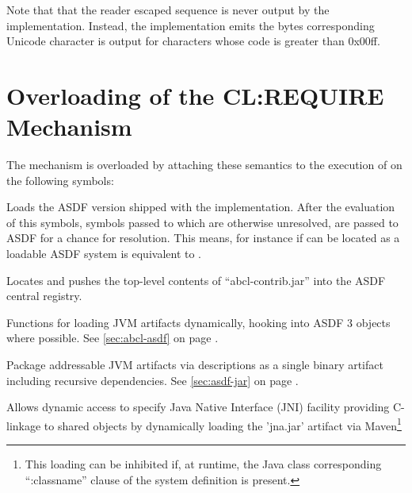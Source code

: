 \documentclass[10pt]{book}
\begin{document}
Note that that the reader escaped sequence is never output by the
implementation.  Instead, the implementation emits the bytes
corresponding Unicode character is output for characters whose code is
greater than 0x00ff.

\section{Overloading of the CL:REQUIRE Mechanism}

The  mechanism is overloaded by attaching these
semantics to the execution of  on the following symbols:

\begin{description}[style=nextline]

  \item[\code{ASDF}] Loads the \textsc{ASDF} version shipped with the
    implementation.  After the evaluation of this symbols, symbols
    passed to  which are otherwise unresolved, are
    passed to ASDF for a chance for resolution.  This means, for
    instance if  can be located as a loadable
    \textsc{ASDF} system  is equivalent to
    .

  \item[\code{ABCL-CONTRIB}] Locates and pushes the top-level contents
    of ``abcl-contrib.jar'' into the \textsc{ASDF} central registry.

    \begin{description}[style=nextline]

    \item[\code{abcl-asdf}] Functions for loading JVM artifacts
        dynamically, hooking into ASDF 3 objects where possible.  See
        \ref{sec:abcl-asdf} on page \pageref{sec:abcl-asdf}.

      \item[\code{asdf-jar}] Package addressable JVM artifacts via
         descriptions as a single binary artifact
        including recursive dependencies.  See \ref{sec:asdf-jar} on
        page \pageref{sec:asdf-jar}.

      \item[\code{jna}] Allows dynamic access to specify Java Native
        Interface (JNI) facility providing C-linkage to shared objects
        by dynamically loading the 'jna.jar' artifact via
        Maven\footnote{This loading can be inhibited if, at runtime,
        the Java class corresponding ``:classname'' clause of the
        system definition is present.}


\end{description}
\end{description}
\end{document}

